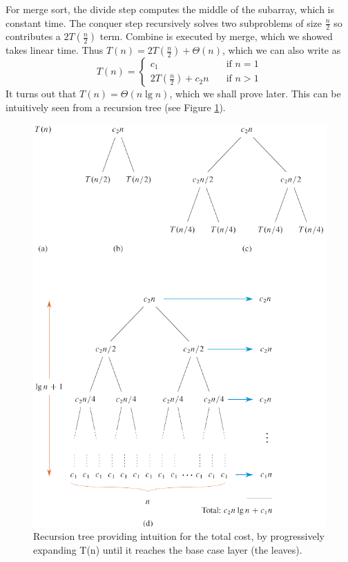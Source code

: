 \documentclass[12pt]{article}
\begin{document}
For merge sort, the divide step computes the middle of the subarray, which is constant time. The conquer step recursively
solves two subproblems of size $\frac{n}{2}$ so contributes a $2T(\frac{n}{2})$ term. Combine is executed by merge, which
we showed takes linear time. Thus $T(n) = 2T(\frac{n}{2}) + \Theta(n)$, which we can also write as
\[ T(n) =
  \begin{cases}
    c_1       & \quad \text{if } n = 1\\
    2T(\frac{n}{2}) + c_2n  & \quad \text{if } n > 1
  \end{cases}
\]
It turns out that $T(n) = \Theta(n\lg n)$, which we shall prove later. This can be intuitively seen from a recursion tree (see Figure \ref{Figure: recursion tree}).
\begin{figure}[ht]\centering
    \includegraphics[angle=0]{Figures/recursion-tree.pdf}
    \caption{Recursion tree providing intuition for the total cost, by progressively expanding T(n) until
    it reaches the base case layer (the leaves).}
    \label{Figure: recursion tree}
\end{figure}
\end{document}
